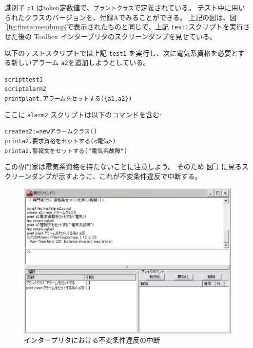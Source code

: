 \documentclass[\pformat,12pt,twoside]{jarticle}
\begin{document}
識別子 \texttt{p1} はtoken定数値で、\texttt{プラントクラス}で定義されている。
テスト中に用いられたクラスのバージョンを、付録Aでみることができる。
上記の図は、図‾\ref{fig:firstscreendump}で表示されたものと同じで、上記  \texttt{test1}スクリプトを実行させた後の Toolbox インタープリタのスクリーンダンプを見せている。

以下のテストスクリプトでは上記 \texttt{test1} を実行し、次に電気系資格を必要とする新しいアラーム \texttt{a2}を追加しようとしている。

\small
\begin{alltt}
  script test1
  script alarm2
  print plant.アラームをセットする(\{a1,a2\})

\end{alltt}
\normalsize

ここに \texttt{alarm2} スクリプトは以下のコマンドを含む:

\small
\begin{alltt}
  create a2:= new アラームクラス()
  print a2.要求資格をセットする(\texttt{<}電気\texttt{>})
  print a2.警報文をセットする("電気系故障")

\end{alltt}
\normalsize

この専門家は電気系資格を持たないことに注意しよう。
そのため 図‾\ref{fig:secondscreendump} に見るスクリーンダンプが示すように、これが不変条件違反で中断する。

\begin{figure}[htb]
\begin{center}
\includegraphics[width=5.546in]{secondscreendump}
\caption{インタープリタにおける不変条件違反の中断 \label{fig:secondscreendump}}
\end{center}
\end{figure}
\end{document}
